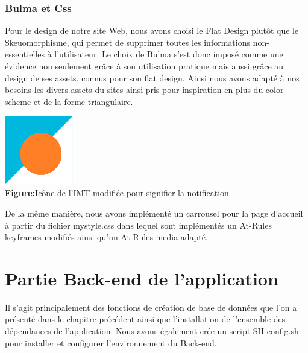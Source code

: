  \subsubsection{Bulma et Css}
 Pour le design de notre site Web, nous avons choisi le Flat Design plutôt que le Skeuomorphisme, qui permet de supprimer toutes les informations non-essentielles à l'utilisateur. Le choix de Bulma s'est donc imposé comme une évidence non seulement grâce à son utilisation pratique mais aussi grâce au design de ses assets, connus pour son flat design. Ainsi nous avons adapté à nos besoins les divers assets du sites ainsi pris pour inspiration en plus du color scheme et de la forme triangulaire. 
  \begin{center}
         \includegraphics[width=3cm]{favicon.png}\\
         \textbf{Figure:}Icône de l'IMT modifiée pour signifier la notification 
         \end{center}
 De la même manière, nous avons implémenté un carrousel pour la page d'accueil à partir du fichier  mystyle.css dans lequel  sont implémentés un At-Rules keyframes modifiés ainsi qu'un At-Rules media adapté.

 \section{Partie Back-end de l'application}
 Il s'agit principalement des fonctions de création de base de données que l'on a présenté dans le chapitre précédent ainsi que l'installation de l'ensemble des dépendances de l'application. Nous avons également crée un script SH config.sh pour installer et configurer l'environnement du Back-end.
